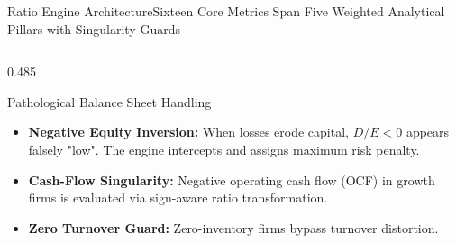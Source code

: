 \begin{frame}{Ratio Engine Architecture}{Sixteen Core Metrics Span Five Weighted Analytical Pillars with Singularity Guards}
\begin{columns}[T,onlytextwidth]
\begin{column}{0.485\textwidth}
            \begin{quantcard}[height=2.74cm]{Pathological Balance Sheet Handling}
                \fontsize{5.8pt}{7.0pt}\selectfont
                \begin{itemize}
                    \setlength{\itemsep}{1.5pt}
                    \item \textbf{Negative Equity Inversion:} When losses erode capital, $D/E < 0$ appears falsely "low". The engine intercepts and assigns maximum risk penalty.
                    \item \textbf{Cash-Flow Singularity:} Negative operating cash flow (OCF) in growth firms is evaluated via sign-aware ratio transformation.
                    \item \textbf{Zero Turnover Guard:} Zero-inventory firms bypass turnover distortion.
                \end{itemize}
            \end{quantcard}
        \end{column}
    \end{columns}
\end{frame}
